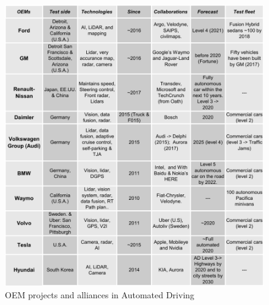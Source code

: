 \begin{figure}[p]
    \centering
    \includegraphics[width=1.00\textwidth]{"img/OEM_jp_trim"}
    \caption{OEM projects and alliances in Automated Driving}
    \label{fig:oem-ad}
\end{figure}

